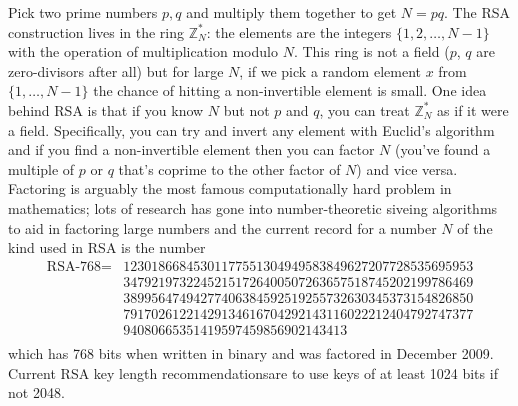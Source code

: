 \documentclass{llncs}
\begin{document}
Pick two prime numbers $p, q$ and multiply them together to get $N = pq$. The
RSA construction lives in the ring $\mathbb Z^*_N$: the elements are the
integers $\{1, 2, \ldots, N-1\}$ with the operation of multiplication modulo
$N$. This ring is not a field ($p$, $q$ are zero-divisors after all) but for
large $N$, if we pick a random element $x$ from $\{1, \ldots, N-1\}$ the chance
of hitting a non-invertible element is small. One idea behind RSA is that if you
know $N$ but not $p$ and $q$, you can treat $\mathbb Z^*_N$ as if it were a
field. Specifically, you can try and invert any element with Euclid's algorithm
and if you find a non-invertible element then you can factor $N$ (you've found a
multiple of $p$ or $q$ that's coprime to the other factor of $N$) and vice
versa. Factoring is arguably the most famous computationally hard problem in
mathematics; lots of research has gone into number-theoretic siveing algorithms
to aid in factoring large numbers and the current record for a number $N$ of the
kind used in RSA is the number 
\[\begin{array}{rl}
\textrm{RSA-768} = & 
12301866845301177551304949583849627207728535695953 \\ &
34792197322452151726400507263657518745202199786469 \\ &
38995647494277406384592519255732630345373154826850 \\ &
79170261221429134616704292143116022212404792747377 \\ &
94080665351419597459856902143413 \\
\end{array}\]
which has 768 bits when written in binary and was factored in December 2009.
Current RSA key length recommendations\footnotemark are to use keys of at least
1024 bits if not 2048.
\end{document}
